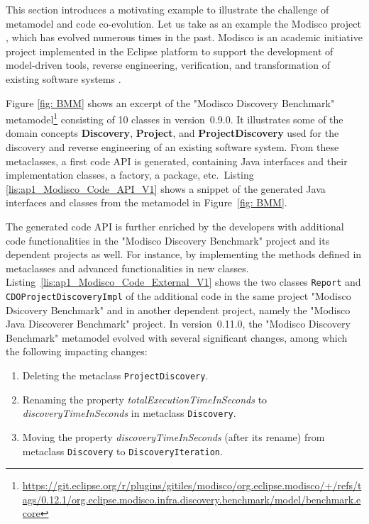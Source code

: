 This section introduces a motivating example to illustrate the challenge of metamodel and code co-evolution. 
Let us take as an example the Modisco project \cite{MDTModisco}, which has evolved numerous times in the past. Modisco is an academic initiative project implemented in the Eclipse platform to support the development of model-driven tools, reverse engineering, verification, and transformation of existing software systems \cite{bruneliere2010modisco,bruneliere2014modisco}.


Figure \ref{fig: BMM} shows an excerpt of the "Modisco Discovery Benchmark" metamodel\footnote{\url{https://git.eclipse.org/r/plugins/gitiles/modisco/org.eclipse.modisco/+/refs/tags/0.12.1/org.eclipse.modisco.infra.discovery.benchmark/model/benchmark.ecore}} consisting of 10 classes in version~0.9.0.
It illustrates some of the domain concepts \textbf{Discovery}, \textbf{Project}, and \textbf{ProjectDiscovery}  used for the discovery and reverse engineering of an existing software system. 
From these metaclasses, a first code API is generated, containing Java interfaces and their implementation classes, a factory, a package, etc.~Listing \ref{lis:ap1_Modisco_Code_API_V1} shows a snippet of the generated Java interfaces and classes from the metamodel in Figure~\ref{fig: BMM}. 

The generated code API is further enriched by the developers with additional code functionalities in the "Modisco Discovery Benchmark" project and its dependent projects as well.
For instance, by implementing the methods defined in metaclasses and advanced functionalities in new classes. Listing~\ref{lis:ap1_Modisco_Code_External_V1} shows the two classes \texttt{Report} and \texttt{CDOProjectDiscoveryImpl} of the additional code in the same project "Modisco Dsicovery Benchmark" and in another dependent project, namely the "Modisco Java Discoverer Benchmark" project. 
In version~0.11.0, the "Modisco Discovery Benchmark" metamodel evolved with several significant changes, among which the following impacting changes:

\begin{enumerate}%
	
	\item Deleting the metaclass \texttt{ProjectDiscovery}. 
	
	\item Renaming the property \emph{totalExecutionTimeInSeconds} to \emph{discoveryTimeInSeconds} in metaclass \texttt{Discovery}. 
	
	\item Moving the property \emph{discoveryTimeInSeconds} (after its rename) from metaclass \texttt{Discovery} to \texttt{DiscoveryIteration}. 
	
\end{enumerate} 


